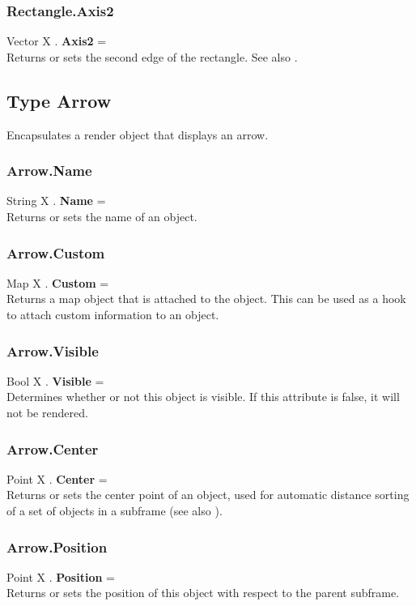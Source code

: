 \subsubsection{Rectangle.Axis2 \label{F:Rectangle:Axis2}}
Vector X . \textbf{Axis2} = \\
Returns or sets the second edge of the rectangle. See also .



\subsection{Type Arrow \label{T:Arrow}}
Encapsulates a render object that displays an arrow.

\subsubsection{Arrow.Name \label{F:Arrow:Name}}
String X . \textbf{Name} = \\
Returns or sets the name of an object.

\subsubsection{Arrow.Custom \label{F:Arrow:Custom}}
Map X . \textbf{Custom} = \\
Returns a map object that is attached to the object. This can be used as a hook to attach custom information to an object.


\subsubsection{Arrow.Visible \label{F:Arrow:Visible}}
Bool X . \textbf{Visible} = \\
Determines whether or not this object is visible. If this attribute is false, it will not be rendered.

\subsubsection{Arrow.Center \label{F:Arrow:Center}}
Point X . \textbf{Center} = \\
Returns or sets the center point of an object, used for automatic distance sorting of a set of objects in a subframe (see also ).

\subsubsection{Arrow.Position \label{F:Arrow:Position}}
Point X . \textbf{Position} = \\
Returns or sets the position of this object with respect to the parent subframe.

